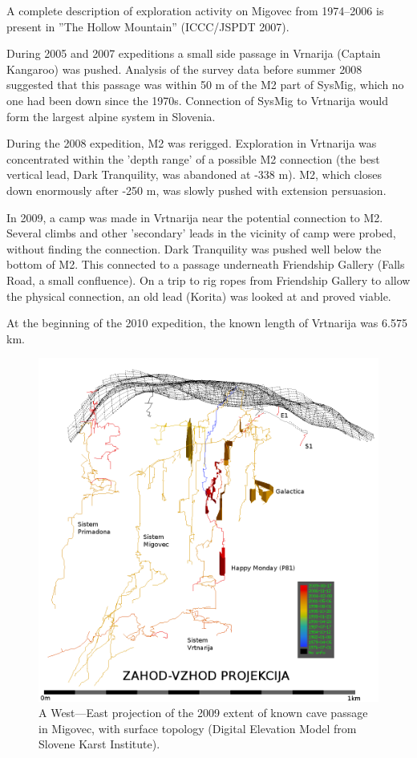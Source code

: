 \documentclass[english,a4]{article}
\begin{document}
A complete description of exploration activity on Migovec from 1974--2006 is
present in ''The Hollow Mountain'' (ICCC/JSPDT 2007).

During 2005 and 2007 expeditions a small side passage in Vrnarija
(Captain Kangaroo) was pushed. Analysis of the survey data before
summer 2008 suggested that this passage was within 50 m of the M2
part of SysMig, which no one had been down since the 1970s. Connection
of SysMig to Vrtnarija would form the largest alpine system in Slovenia.

During the 2008 expedition, M2 was rerigged. Exploration in Vrtnarija
was concentrated within the 'depth range' of a possible M2 connection
(the best vertical lead, Dark Tranquility, was abandoned at -338 m).
M2, which closes down enormously after -250 m, was slowly pushed with
extension persuasion. 

In 2009, a camp was made in Vrtnarija near the potential connection
to M2. Several climbs and other 'secondary' leads in the vicinity
of camp were probed, without finding the connection. Dark Tranquility
was pushed well below the bottom of M2. This connected to a passage underneath
Friendship Gallery (Falls Road, a small confluence). 
On a trip to rig ropes from Friendship Gallery to allow the physical
connection, an old lead (Korita) was looked at and proved viable.

At the beginning of the 2010 expedition, the known length of Vrtnarija
was 6.575 km.

\begin{center}
\begin{figure}
\centering
\includegraphics[width=0.75\columnwidth]{mig_2009_for_jamar}
\caption{A West---East projection of the 2009 extent of known cave passage in Migovec, with surface topology
(Digital Elevation Model from Slovene Karst Institute).}
\end{figure}
\end{center}
\end{document}
